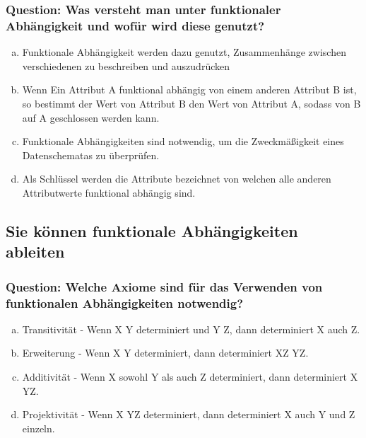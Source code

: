 \documentclass{article}
\begin{document}
\begin{adjustwidth}{2em}{2em}
\begin{adjustwidth}{2em}{2em}
\begin{adjustwidth}{1em}{}
				\subsubsection*{Question: Was versteht man unter funktionaler Abhängigkeit und wofür wird diese genutzt?}
				\begin{adjustwidth}{1em}{}
					\begin{enumerate}[(a)]
						\item Funktionale Abhängigkeit werden dazu genutzt, Zusammenhänge zwischen verschiedenen zu beschreiben und auszudrücken
						\item Wenn Ein Attribut A funktional abhängig von einem anderen Attribut B ist, so bestimmt der Wert von Attribut B den Wert von Attribut A, sodass von B auf A geschlossen werden kann.
						\item Funktionale Abhängigkeiten sind notwendig, um die Zweckmäßigkeit eines Datenschematas zu überprüfen.
						\item Als Schlüssel werden die Attribute bezeichnet von welchen alle anderen Attributwerte funktional abhängig sind.
					\end{enumerate}
				\end{adjustwidth}
			\end{adjustwidth}
			\subsection{Sie können funktionale Abhängigkeiten ableiten}
			\begin{adjustwidth}{1em}{}
				\subsubsection*{Question: Welche Axiome sind für das Verwenden von funktionalen Abhängigkeiten notwendig?}
				\begin{adjustwidth}{1em}{}
					\begin{enumerate}[(a)]
						\item Transitivität - Wenn X Y determiniert und Y Z, dann determiniert X auch Z.
						\item Erweiterung - Wenn X Y determiniert, dann determiniert XZ YZ.
						\item Additivität - Wenn X sowohl Y als auch Z determiniert, dann determiniert X YZ.
						\item Projektivität - Wenn X YZ determiniert, dann determiniert X auch Y und Z einzeln.
					\end{enumerate}
				\end{adjustwidth}
			\end{adjustwidth}

\end{adjustwidth}
\end{adjustwidth}
\end{document}
